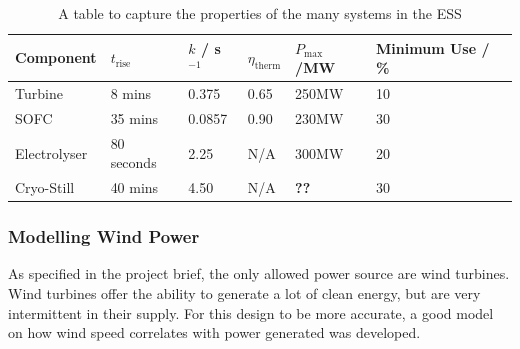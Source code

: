 %
    \begin{table}[ht]
            \centering
        \begin{tabular}{||l l l l l l||}
                \hline
                Component & $t_{\text{rise}}$ & $k$ / s$^{-1}$ & $\eta_{\text{therm}}$ & $P_{\text{max}}$/MW& Minimum Use / \%\\
                \hline
                \hline
                Turbine& 8 mins & 0.375 & 0.65 & 250MW & 10\\
                \hline
                SOFC& 35 mins & 0.0857 & 0.90 & 230MW & 30\\
                \hline
                Electrolyser& 80 seconds & 2.25 & N/A & 300MW & 20\\
                \hline
                Cryo-Still & 40 mins & 4.50 & N/A & {\textbf{\color{red}??}} & 30\\
                \hline
        \end{tabular}
        \caption{A table to capture the properties of the many systems in the ESS}
                \label{tbl:time}
    \end{table}

\subsubsection{Modelling Wind Power}

As specified in the project brief, the only allowed power source are wind turbines.
Wind turbines offer the ability to generate a lot of clean energy, but are very intermittent in their supply.
For this design to be more accurate, a good model on how wind speed correlates with power generated was developed.

